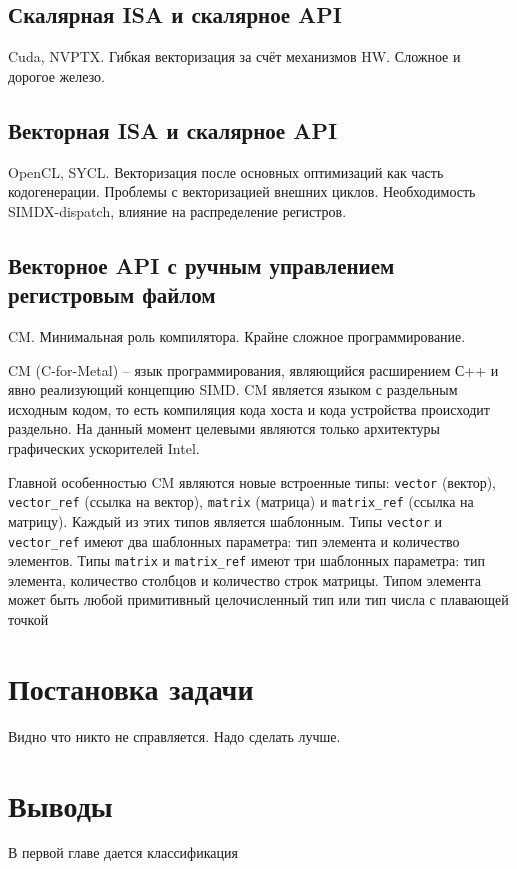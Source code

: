 \subsection{Скалярная ISA и скалярное API}\label{subsec:overview/vectorizing/cuda}

Cuda, NVPTX. Гибкая векторизация за счёт механизмов HW. Сложное и дорогое железо.

\subsection{Векторная ISA и скалярное API}\label{subsec:overview/vectorizing/sycl}

OpenCL, SYCL. Векторизация после основных оптимизаций как часть кодогенерации. Проблемы с векторизацией внешних циклов. Необходимость SIMDX-dispatch, влияние на распределение регистров.

\subsection{Векторное API с ручным управлением регистровым файлом}\label{subsec:overview/vectorizing/cm}

CM. Минимальная роль компилятора. Крайне сложное программирование.

CM (C-for-Metal) -- язык программирования, являющийся расширением С++ и явно реализующий концепцию SIMD. CM является языком с раздельным исходным кодом, то есть компиляция кода хоста и кода устройства происходит раздельно. На данный момент целевыми являются только архитектуры графических ускорителей Intel.

Главной особенностью CM являются новые встроенные типы: \texttt{vector} (вектор), \texttt{vector\_ref} (ссылка на вектор), \texttt{matrix} (матрица) и \texttt{matrix\_ref} (ссылка на матрицу). Каждый из этих типов является шаблонным. Типы \texttt{vector} и \texttt{vector\_ref} имеют два шаблонных параметра: тип элемента и количество элементов. Типы \texttt{matrix} и \texttt{matrix\_ref} имеют три шаблонных
параметра: тип элемента, количество столбцов и количество строк матрицы. Типом элемента может быть любой примитивный целочисленный тип или тип числа с плавающей точкой

\section{Постановка задачи}\label{sec:overview/howtobetter}

Видно что никто не справляется. Надо сделать лучше.

\section{Выводы}\label{sec:overview/outcome}

В первой главе дается классификация

\FloatBarrier
